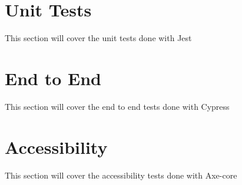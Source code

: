 
\section{Unit Tests}
\label{s:Unit-Tests}
This section will cover the unit tests done with Jest

\section{End to End}
\label{s:End-To-End}
This section will cover the end to end tests done with Cypress

\section{Accessibility}
\label{s:Accessibility}
This section will cover the accessibility tests done with Axe-core
